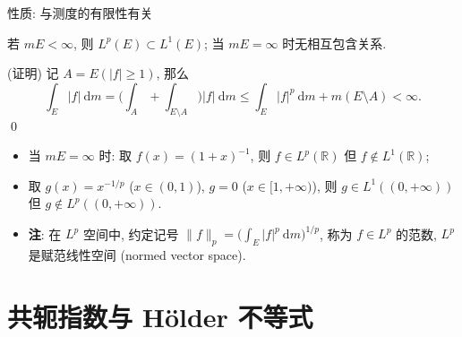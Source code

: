 \begin{frame}{性质: 与测度的有限性有关}

\begin{prop}
若 $mE < \infty$, 则 $L^p(E) \subset L^1(E)$; \quad
当 $mE = \infty$ 时无相互包含关系.
\end{prop}

\startproof[bg=yellow, fg=red](证明)
记 $A = E(|f| \geqslant 1)$, 那么
\[
\int_E |f| ~ \mathrm{d} m
= \Big( \int_A + \int_{E \setminus A} \Big) |f| ~ \mathrm{d} m
\leqslant \int_E |f|^p ~ \mathrm{d} m + m(E \setminus A) < \infty .
\]
\qed

\pause

\begin{itemize}
\item 当 $mE = \infty$ 时: 取 $f(x) = (1+x)^{-1}$, 则 $f \in L^p(\mathbb{R})$
  但 $f \notin L^1(\mathbb{R})$;
\item 取 $g(x) = x^{-1/p}$ ($x \in (0,1)$), $g = 0$ ($x \in [1, +\infty)$),
  则 $g \in L^1((0, +\infty))$ 但 $g \notin L^p((0, +\infty))$.
\end{itemize}

\pause

\begin{itemize}
\item \textbf{注}: 在 $L^p$ 空间中, 约定记号
  $\lVert f \rVert_p = \big( \int_E |f|^p ~ \mathrm{d} m \big)^{1/p}$,
  称为 $f \in L^p$ 的\alert{范数}, $L^p$ 是\alert{赋范线性空间} (normed vector space).
\end{itemize}

\end{frame}


\section[Hölder]{共轭指数与 Hölder 不等式}


